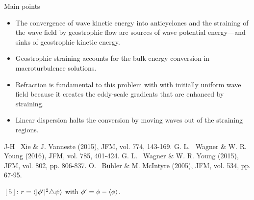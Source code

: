 \documentclass[final]{beamer}
\begin{document}
\begin{frame}[t]
\begin{columns}[t]
\begin{column}{0.55\textwidth}
\begin{columns}
\begin{column}{0.475\textwidth}
{\begin{alertblock}{Main points}
                          \begin{itemize}
                              \item The convergence of wave kinetic energy into
                                    anticyclones and the straining of the wave field
                                    by geostrophic flow are sources of wave potential
                                    energy---and sinks of geostrophic kinetic energy.
                              \item Geostrophic straining accounts for the bulk
                                    energy conversion in macroturbulence solutions.
                              \item Refraction is fundamental to this problem with
                                    with initially uniform wave field because
                                    it creates the  eddy-scale gradients that are
                                    enhanced by straining.
                              \item Linear dispersion halts the conversion by moving
                                    waves out of the straining regions.
                          \end{itemize}

                      \end{alertblock}
                      }

                          \begin{block}{}
                            \small{\begin{thebibliography}{99}
                             J-H~ Xie \& J. Vanneste (2015), JFM,
                                            vol. 774, 143-169.
                             G. L.~ Wagner \& W. R. Young (2016), JFM,
                                            vol. 785, 401-424.
                             G. L.~ Wagner \& W. R. Young (2015), JFM,
                                            vol. 802, pp. 806-837.
                             O.~ B{\"u}hler \& M. McIntyre (2005), JFM,
                                            vol. 534, pp. 67-95.

                            \end{thebibliography}}
                            \vspace{.4cm}
                            $[5]$: $r=\langle |\phi'|^2 \triangle\psi \rangle$
                                     with $\phi' = \phi-\langle\phi\rangle$.


\end{block}
\end{column}
\end{columns}
\end{column}
\end{columns}
\end{frame}
\end{document}
